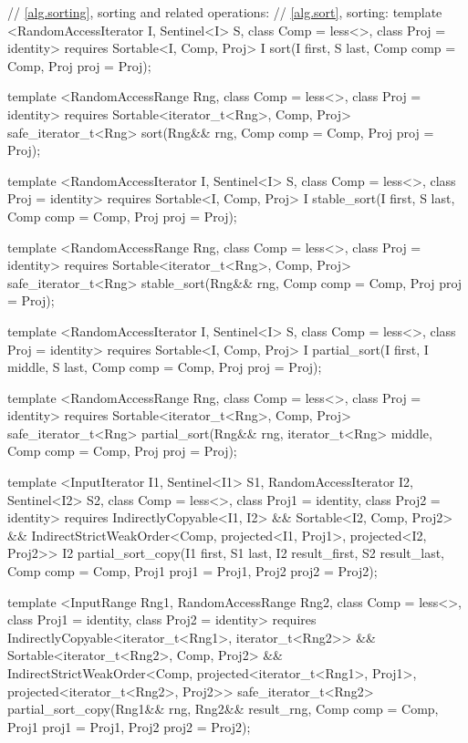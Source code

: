 \begin{codeblock}
{{{{  // \ref{alg.sorting}, sorting and related operations:
  // \ref{alg.sort}, sorting:
  template <RandomAccessIterator I, Sentinel<I> S, class Comp = less<>,
      class Proj = identity>
    requires Sortable<I, Comp, Proj>
    I sort(I first, S last, Comp comp = Comp{}, Proj proj = Proj{});

  template <RandomAccessRange Rng, class Comp = less<>, class Proj = identity>
    requires Sortable<iterator_t<Rng>, Comp, Proj>
    safe_iterator_t<Rng>
      sort(Rng&& rng, Comp comp = Comp{}, Proj proj = Proj{});

  template <RandomAccessIterator I, Sentinel<I> S, class Comp = less<>,
      class Proj = identity>
    requires Sortable<I, Comp, Proj>
    I stable_sort(I first, S last, Comp comp = Comp{}, Proj proj = Proj{});

  template <RandomAccessRange Rng, class Comp = less<>, class Proj = identity>
    requires Sortable<iterator_t<Rng>, Comp, Proj>
    safe_iterator_t<Rng>
      stable_sort(Rng&& rng, Comp comp = Comp{}, Proj proj = Proj{});

  template <RandomAccessIterator I, Sentinel<I> S, class Comp = less<>,
      class Proj = identity>
    requires Sortable<I, Comp, Proj>
    I partial_sort(I first, I middle, S last, Comp comp = Comp{}, Proj proj = Proj{});

  template <RandomAccessRange Rng, class Comp = less<>, class Proj = identity>
    requires Sortable<iterator_t<Rng>, Comp, Proj>
    safe_iterator_t<Rng>
      partial_sort(Rng&& rng, iterator_t<Rng> middle, Comp comp = Comp{},
                   Proj proj = Proj{});

  template <InputIterator I1, Sentinel<I1> S1, RandomAccessIterator I2, Sentinel<I2> S2,
      class Comp = less<>, class Proj1 = identity, class Proj2 = identity>
    requires IndirectlyCopyable<I1, I2> && Sortable<I2, Comp, Proj2> &&
        IndirectStrictWeakOrder<Comp, projected<I1, Proj1>, projected<I2, Proj2>>
    I2
      partial_sort_copy(I1 first, S1 last, I2 result_first, S2 result_last,
                        Comp comp = Comp{}, Proj1 proj1 = Proj1{}, Proj2 proj2 = Proj2{});

  template <InputRange Rng1, RandomAccessRange Rng2, class Comp = less<>,
      class Proj1 = identity, class Proj2 = identity>
    requires IndirectlyCopyable<iterator_t<Rng1>, iterator_t<Rng2>> &&
        Sortable<iterator_t<Rng2>, Comp, Proj2> &&
        IndirectStrictWeakOrder<Comp, projected<iterator_t<Rng1>, Proj1>,
          projected<iterator_t<Rng2>, Proj2>>
    safe_iterator_t<Rng2>
      partial_sort_copy(Rng1&& rng, Rng2&& result_rng, Comp comp = Comp{},
                        Proj1 proj1 = Proj1{}, Proj2 proj2 = Proj2{});

}}}}
\end{codeblock}
